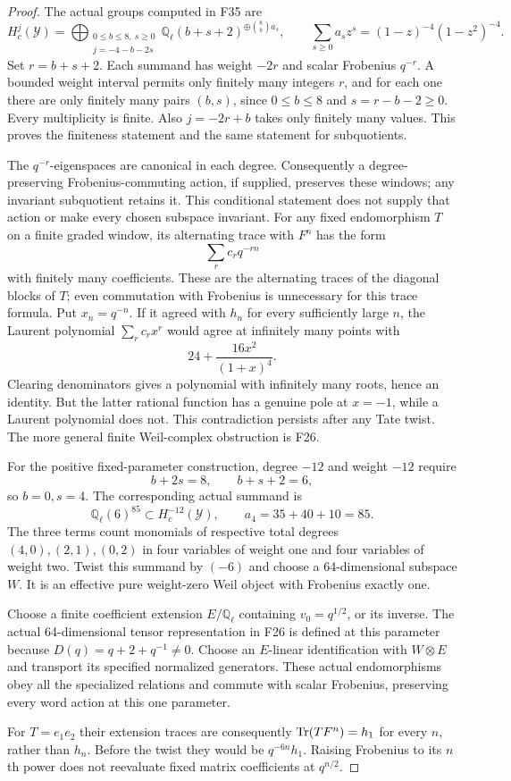 \documentclass[11pt,a4paper]{article}
\newcommand{\Q}{\mathbb Q}\newcommand{\Z}{\mathbb Z}\newcommand{\C}{\mathbb C}\newcommand{\N}{\mathbb N}\newcommand{\F}{\mathbb F}
\newcommand{\fid}[1]{\textsf{#1}}\newcommand{\gate}[1]{\textsf{#1}}
\theoremstyle{named}\newtheorem{finding}{Finding}[section]
\theoremstyle{definition}\newtheorem{definition}[finding]{Definition}
\theoremstyle{remark}\newtheorem{remark}[finding]{Remark}
\begin{document}
\begin{proof}
The actual groups computed in \fid{F35} are
\[
 H_c^j(\mathcal Y)=
 \bigoplus_{\substack{0\le b\le8,\ s\ge0\\j=-4-b-2s}}
     \Q_\ell(b+s+2)^{\oplus\binom8b a_s},
 \qquad
 \sum_{s\ge0}a_s z^s=(1-z)^{-4}(1-z^2)^{-4}.
\]
Set $r=b+s+2$. Each summand has weight $-2r$ and scalar
Frobenius $q^{-r}$. A bounded weight interval permits only
finitely many integers $r$, and for each one there are only
finitely many pairs $(b,s)$, since $0\le b\le8$ and
$s=r-b-2\ge0$. Every multiplicity is finite. Also
$j=-2r+b$ takes only finitely many values. This proves the
finiteness statement and the same statement for subquotients.

The $q^{-r}$-eigenspaces are canonical in each degree.
Consequently a degree-preserving Frobenius-commuting action,
if supplied, preserves these windows; any invariant
subquotient retains it. This conditional statement does not
supply that action or make every chosen subspace invariant.
For any fixed endomorphism $T$ on a finite graded window,
its alternating trace with $F^n$ has the form
\[
 \sum_r c_r q^{-rn}
\]
with finitely many coefficients. These are the alternating
traces of the diagonal blocks of $T$; even commutation with
Frobenius is unnecessary for this trace formula.
Put $x_n=q^{-n}$. If it agreed with $h_n$ for every
sufficiently large $n$, the Laurent polynomial $\sum_r c_rx^r$
would agree at infinitely many points with
\[
 24+\frac{16x^2}{(1+x)^4}.
\]
Clearing denominators gives a polynomial with infinitely many
roots, hence an identity. But the latter rational function has
a genuine pole at $x=-1$, while a Laurent polynomial does not.
This contradiction persists after any Tate twist. The more
general finite Weil-complex obstruction is \fid{F26}.

For the positive fixed-parameter construction, degree $-12$
and weight $-12$ require
\[
 b+2s=8,\qquad b+s+2=6,
\]
so $b=0,s=4$. The corresponding actual summand is
\[
 \Q_\ell(6)^{85}\subset H_c^{-12}(\mathcal Y),
 \qquad a_4=35+40+10=85.
\]
The three terms count monomials of respective total degrees
$(4,0),(2,1),(0,2)$ in four variables of weight one and four
variables of weight two. Twist this summand by $(-6)$ and
choose a 64-dimensional subspace $W$. It is an effective
pure weight-zero Weil object with Frobenius exactly one.

Choose a finite coefficient extension $E/\Q_\ell$ containing
$v_0=q^{1/2}$, or its inverse. The actual 64-dimensional tensor
representation in \fid{F26} is defined at this parameter because
$D(q)=q+2+q^{-1}\ne0$. Choose an $E$-linear identification
with $W\otimes E$ and transport its specified normalized
generators. These actual endomorphisms obey all the specialized
relations and commute with scalar Frobenius, preserving every
word action at this one parameter.

For $T=e_1e_2$ their extension traces are consequently
$\operatorname{Tr}(TF^n)=h_1$ for every $n$, rather than $h_n$.
Before the twist they would be $q^{-6n}h_1$.
Raising Frobenius to its $n$th power does not reevaluate fixed
matrix coefficients at $q^{n/2}$.
\end{proof}
\end{document}
